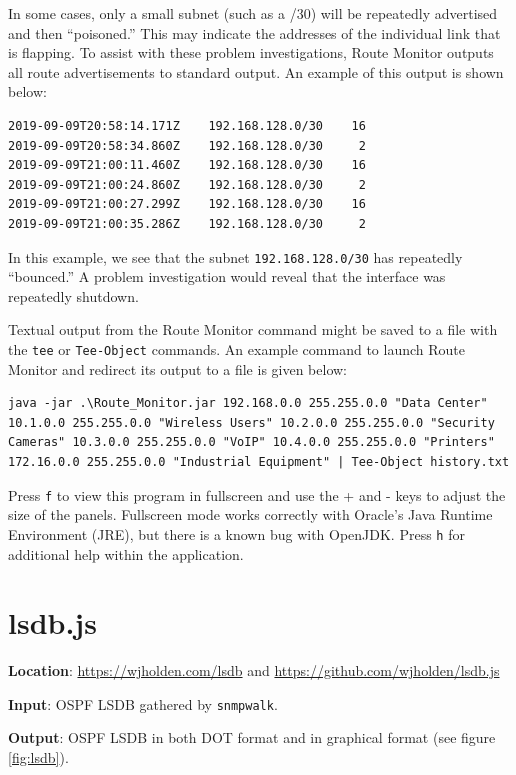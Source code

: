\documentclass[12pt]{article}
\begin{document}
In some cases, only a small subnet (such as a /30) will be repeatedly advertised and then ``poisoned.'' This may indicate the addresses of the individual link that is flapping. To assist with these problem investigations, Route Monitor outputs all route advertisements to standard output. An example of this output is shown below:

\begin{lstlisting}
2019-09-09T20:58:14.171Z	192.168.128.0/30   	16
2019-09-09T20:58:34.860Z	192.168.128.0/30   	 2
2019-09-09T21:00:11.460Z	192.168.128.0/30   	16
2019-09-09T21:00:24.860Z	192.168.128.0/30   	 2
2019-09-09T21:00:27.299Z	192.168.128.0/30   	16
2019-09-09T21:00:35.286Z	192.168.128.0/30   	 2
\end{lstlisting}

In this example, we see that the subnet \texttt{192.168.128.0/30} has repeatedly ``bounced.'' A problem investigation would reveal that the interface was repeatedly shutdown.

Textual output from the Route Monitor command might be saved to a file with the \texttt{tee} or \texttt{Tee-Object} commands. An example command to launch Route Monitor and redirect its output to a file is given below:

\begin{lstlisting}
java -jar .\Route_Monitor.jar 192.168.0.0 255.255.0.0 "Data Center" 10.1.0.0 255.255.0.0 "Wireless Users" 10.2.0.0 255.255.0.0 "Security Cameras" 10.3.0.0 255.255.0.0 "VoIP" 10.4.0.0 255.255.0.0 "Printers" 172.16.0.0 255.255.0.0 "Industrial Equipment" | Tee-Object history.txt
\end{lstlisting}

Press \texttt{f} to view this program in fullscreen and use the + and - keys to adjust the size of the panels. Fullscreen mode works correctly with Oracle's Java Runtime Environment (JRE), but there is a known bug with OpenJDK. Press \texttt{h} for additional help within the application.

\section{lsdb.js}

\textbf{Location}: \url{https://wjholden.com/lsdb} and \url{https://github.com/wjholden/lsdb.js}

\textbf{Input}: OSPF LSDB gathered by \texttt{snmpwalk}.

\textbf{Output}: OSPF LSDB in both DOT format and in graphical format (see figure \ref{fig:lsdb}).
\end{document}

